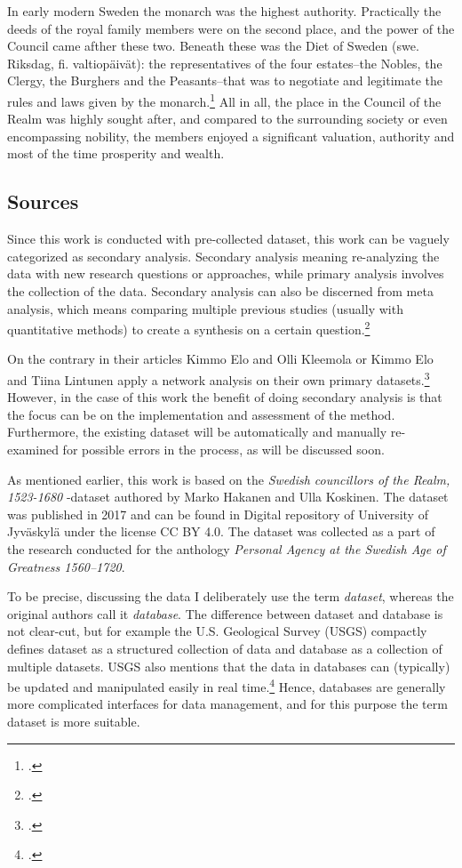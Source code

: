 In early modern Sweden the monarch was the highest authority. Practically the deeds of the royal family members were on the second place, and the power of the Council came afther these two. Beneath these was the Diet of Sweden (swe. Riksdag, fi. valtiopäivät): the representatives of the four estates–the Nobles, the Clergy, the Burghers and the Peasants–that was to negotiate and legitimate the rules and laws given by the monarch.\footcite[pp. 57-61.]{pSuurvalta}  All in all, the place in the Council of the Realm was highly sought after, and compared to the surrounding society or even encompassing nobility, the members enjoyed a significant valuation, authority and most of the time prosperity and wealth.

\subsection{Sources}
\label{sources}
Since this work is conducted with pre-collected dataset, this work can be vaguely categorized as secondary analysis. Secondary analysis meaning re-analyzing the data with new research questions or approaches, while primary analysis involves the collection of the data. Secondary analysis can also be discerned from meta analysis, which means comparing multiple previous studies (usually with quantitative methods) to create a synthesis on a certain question.\footcite[pp. 4-5.]{meta-analysis} 

On the contrary in their articles Kimmo Elo and Olli Kleemola or Kimmo Elo and Tiina Lintunen apply a network analysis on their own primary datasets.\footcites{eloAklee15}{LintunenAndElo2019} However, in the case of this work the benefit of doing secondary analysis is that the focus can be on the implementation and assessment of the method. Furthermore, the existing dataset will be automatically and manually re-examined for possible errors in the process, as will be discussed soon. 

As mentioned earlier, this work is based on the \textit{Swedish councillors of the Realm, 1523-1680} -dataset authored by Marko Hakanen and Ulla Koskinen. The dataset was published in 2017 and can be found in Digital repository of University of Jyväskylä under the license CC BY 4.0. The dataset was collected as a part of the research conducted for the anthology \textit{Personal Agency at the Swedish Age of Greatness 1560–1720}.

To be precise, discussing the data I deliberately use the term \textit{dataset}, whereas the original authors call it \textit{database}. The difference between dataset and database is not clear-cut, but for example the U.S. Geological Survey (USGS) compactly defines dataset as a structured collection of data and database as a collection of multiple datasets. USGS also mentions that the data in databases can (typically) be updated and manipulated easily in real time.\footcite{usgs} Hence, databases are generally more complicated interfaces for data management, and for this purpose the term dataset is more suitable.

